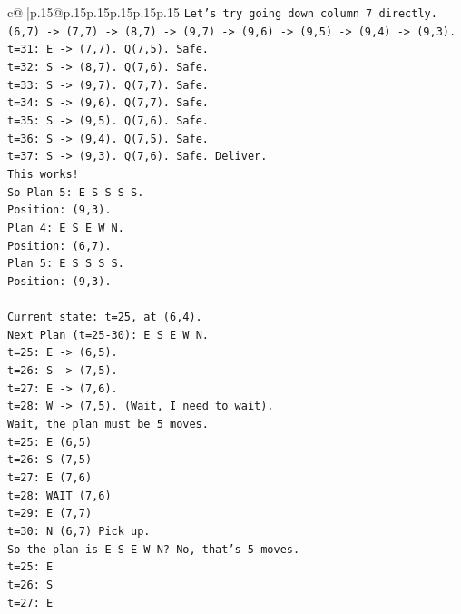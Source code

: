 \documentclass{article}
\begin{document}
{\begin{supertabular}{c@{$\;$}|p{.15\linewidth}@{}p{.15\linewidth}p{.15\linewidth}p{.15\linewidth}p{.15\linewidth}p{.15\linewidth}}
{{{\texttt{Let's try going down column 7 directly.} \\
\texttt{(6,7) {-}> (7,7) {-}> (8,7) {-}> (9,7) {-}> (9,6) {-}> (9,5) {-}> (9,4) {-}> (9,3).} \\
\texttt{t=31: E {-}> (7,7). Q(7,5). Safe.} \\
\texttt{t=32: S {-}> (8,7). Q(7,6). Safe.} \\
\texttt{t=33: S {-}> (9,7). Q(7,7). Safe.} \\
\texttt{t=34: S {-}> (9,6). Q(7,7). Safe.} \\
\texttt{t=35: S {-}> (9,5). Q(7,6). Safe.} \\
\texttt{t=36: S {-}> (9,4). Q(7,5). Safe.} \\
\texttt{t=37: S {-}> (9,3). Q(7,6). Safe. Deliver.} \\
\texttt{This works!} \\
\texttt{So Plan 5: E S S S S.} \\
\texttt{Position: (9,3).} \\
\texttt{Plan 4: E S E W N.} \\
\texttt{Position: (6,7).} \\
\texttt{Plan 5: E S S S S.} \\
\texttt{Position: (9,3).} \\
\\ 
\texttt{Current state: t=25, at (6,4).} \\
\texttt{Next Plan (t=25{-}30): E S E W N.} \\
\texttt{t=25: E {-}> (6,5).} \\
\texttt{t=26: S {-}> (7,5).} \\
\texttt{t=27: E {-}> (7,6).} \\
\texttt{t=28: W {-}> (7,5). (Wait, I need to wait).} \\
\texttt{Wait, the plan must be 5 moves.} \\
\texttt{t=25: E (6,5)} \\
\texttt{t=26: S (7,5)} \\
\texttt{t=27: E (7,6)} \\
\texttt{t=28: WAIT (7,6)} \\
\texttt{t=29: E (7,7)} \\
\texttt{t=30: N (6,7) Pick up.} \\
\texttt{So the plan is E S E W N? No, that's 5 moves.} \\
\texttt{t=25: E} \\
\texttt{t=26: S} \\
\texttt{t=27: E} \\
}}}
\end{supertabular}}
\end{document}
